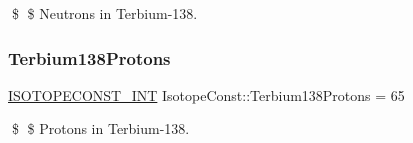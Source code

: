 \$ \$ Neutrons in Terbium-\/138. \mbox{\label{group___isotope_const-_terbium-_tb138_gafba5a2f4599c44076f4601f0d9f9bc52}} 
\subsubsection{\texorpdfstring{Terbium138\+Protons}{Terbium138Protons}}
{\footnotesize\ttfamily \mbox{\hyperlink{group___isotope_const-_macros_ga5f18360b3e99483a35c32d789e62621c}{I\+S\+O\+T\+O\+P\+E\+C\+O\+N\+S\+T\+\_\+\+I\+NT}} Isotope\+Const\+::\+Terbium138\+Protons = 65}

\$ \$ Protons in Terbium-\/138. 
